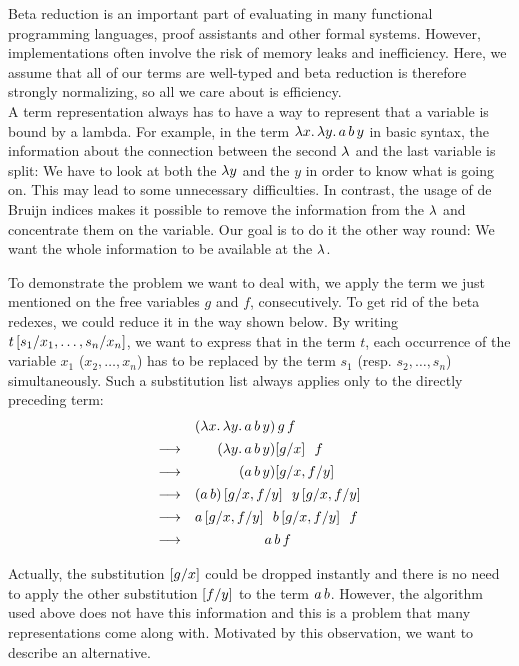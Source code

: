 \documentclass[submission,copyright,creativecommons]{eptcs}
\begin{document}
Beta reduction is an important part of evaluating in many functional programming languages, proof assistants and other formal systems. However, implementations often involve the risk of memory leaks and inefficiency. Here, we assume that all of our terms are well-typed and beta reduction is therefore strongly normalizing, so all we care about is efficiency. \\
A term representation always has to have a way to represent that a variable is bound by a lambda. 
For example, in the term $\lambda {x}. \, \lambda {y}. \, a \, b \, y$ in basic syntax, the information about the connection between the second $\lambda$ and the last variable is split: We have to look at both the $\lambda y$ and the $y$ in order to know what is going on. This may lead to some unnecessary difficulties. In contrast, the usage of de Bruijn indices makes it possible to remove the information from the $\lambda$ and concentrate them on the variable. Our goal is to do it the other way round: We want the whole information to be available at the $\lambda$.

To demonstrate the problem we want to deal with, we apply the term we just mentioned on the free variables $g$ and $f$, consecutively.
To get rid of the beta redexes, we could reduce it in the way shown below. By writing $t\left[ s_1 / x_1 , \ldots, s_n / x_n \right]$, we want to express that in the term $t$, each occurrence of the variable $x_1$ ($x_2, \ldots, x_n$) has to be replaced by the term $s_1$ (resp. $s_2, \ldots, s_n$) simultaneously. Such a substitution list always applies only to the directly preceding term:
\[
\begin{array}{lr@{}l}
\shspace &(\LaA x {\LaA y {\ApA{\ApA a b} y}}) & \sspace g \sspace f \\ 
\shspace\re &(\LaA y {\ApA{\ApA a b} y}) & \sub g x \lspace f \\ 
\shspace\re &      (\ApA{\ApA a b} y) & \subs g x f y \\ 
\shspace\re &      \multicolumn 2 l {(a\sspace b)\subs g x f y \lspace y\subs g x f y} \\ 
\shspace\re &      \multicolumn 2 l {a\subs g x f y \lspace b\subs g x f y \lspace f} \\ 
\shspace\re &      \multicolumn 2 {c} {a \sspace b \sspace f}  \\ 
\end{array}
\]
Actually, the substitution $\left[ g / x \right]$ could be dropped instantly and there is no need to apply the other substitution $\left[ f / y \right]$ to the term $a \, b$. However, the algorithm used above does not have this information and this is a problem that many representations come along with. Motivated by this observation, we want to describe an alternative.
\end{document}
